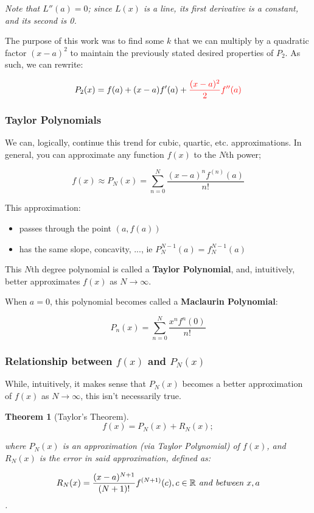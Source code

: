\documentclass[12pt]{article}
\newtheorem*{theorem}{Theorem}
\begin{document}
\textit{Note that $L''(a) = 0$; since $L(x)$ is a line, its first derivative is a constant, and its second is 0.}

The purpose of this work was to find some $k$ that we can multiply by a quadratic factor $(x-a)^2$ to maintain the previously stated desired properties of $P_2$. As such, we can rewrite:

$$P_2(x) = f(a) + (x-a)f'(a) + \textcolor{red}{\frac{(x-a)^2}{2}f''(a)}$$

\subsubsection{Taylor Polynomials}
We can, logically, continue this trend for cubic, quartic, etc. approximations. In general, you can approximate any function $f(x)$ to the $N$th power;

$$f(x) \approx P_N(x) = \sum_{n=0}^{N} \frac{(x-a)^n f^{(n)}(a)}{n!}$$

This approximation:
\begin{itemize}
    \item passes through the point $(a,f(a))$
    \item has the same slope, concavity, ..., ie $P_N^{N-1}(a) = f_N^{N-1}(a)$
\end{itemize}

This $N$th degree polynomial is called a \textbf{Taylor Polynomial}, and, intuitively, better approximates $f(x)$ as $N \to \infty$.

When $a = 0$, this polynomial becomes called a \textbf{Maclaurin Polynomial}:

$$P_n(x) = \sum_{n=0}^{N} \frac{x^n f^n(0)}{n!}$$

\subsubsection{Relationship between \texorpdfstring{$f(x)$}{a function} and \texorpdfstring{$P_N(x)$}{its approximation}}

While, intuitively, it makes sense that $P_N(x)$ becomes a better approximation of $f(x)$ as $N\to\infty$, this isn't necessarily true.

\begin{theorem}[Taylor's Theorem]
$$f(x) = P_N(x) + R_N(x);$$

where $P_N(x)$ is an approximation (via Taylor Polynomial) of $f(x)$, and $R_N(x)$ is the error in said approximation, defined as:

$$R_N(x) = \frac{(x-a)^{N+1}}{(N+1)!}f^{(N+1)}(c), c \in \mathbb{R} \textit{ and between } x, a$$.
\end{theorem}
\end{document}
